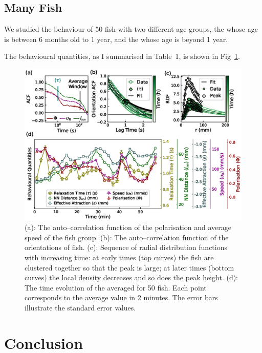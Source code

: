 \documentclass[11pt,twoside]{report}
\begin{document}
\subsection{Many Fish}
\label{section:fish_many_3d}

We studied the behaviour of 50 fish with two different age groups, the {\smallfish} whose age is between 6 months old to 1 year, and the {\bigfish} whose age is beyond 1 year.

The behavioural quantities, as I summarised in Table~1, is shown in Fig~\ref{fig:descriptor-many-fish}.

\begin{figure}
  \includegraphics[width=\linewidth,outer]{descriptor-many-fish}
  \caption[The behavioural descriptors of 50 zebrafish]{
  	(a): The auto--correlation function of the polarisation and average speed of the fish group.
	(b): The auto--correlation function of the orientations of fish.
	(c): Sequence of radial distribution functions with increasing time: at early times (top curves) the fish are clustered together so that the peak is large; at later times (bottom curves) the local density decreases and so does the peak height.
	(d): The time evolution of the averaged {\descriptors} for 50 {\smallfish} fish. Each point corresponds to the average value in 2 minutes.
	The error bars illustrate the standard error values.
  }
  \label{fig:descriptor-many-fish}
\end{figure}

\section{Conclusion}
\end{document}
